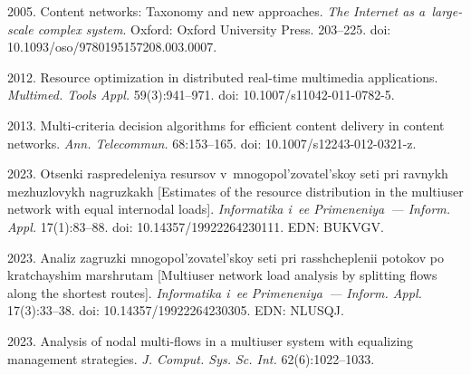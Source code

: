   \begin{multicols}{2}

\renewcommand{\bibname}{\protect\rmfamily References}

{\small\frenchspacing
 {\baselineskip=10.5pt
 \begin{thebibliography}{9} 
 
 
 2005. Content networks: Taxonomy and 
new approaches. \textit{The Internet as a~large-scale complex system}. Oxford: 
Oxford University Press. 203--225. doi: 10.1093/oso/9780195157208.003.0007.


 2012. 
Resource optimization in distributed real-time multimedia applications. 
\textit{Multimed. Tools Appl.} 59(3):941--971. doi: 10.1007/s11042-011-0782-5.

 2013. 
Multi-criteria decision algorithms for efficient content delivery in content 
networks. \textit{Ann. Telecommun.} 68:153--165. doi: 10.1007/s12243-012-0321-z.

 2023. Otsenki 
raspredeleniya resursov v~mnogopol'zovatel'skoy seti pri ravnykh 
mezhuzlovykh nagruzkakh [Estimates of the resource distribution in the multiuser 
network with equal internodal loads]. \textit{Informatika i~ee Primeneniya~--- 
Inform. Appl.} 17(1):83--88. doi: 10.14357/19922264230111. EDN: BUKVGV.

 2023.  Analiz zagruzki  
mnogopol'zovatel'skoy seti pri rasshcheplenii potokov po kratchayshim 
marshrutam [Multiuser network load analysis by splitting flows along the 
shortest routes]. \textit{Informatika i~ee Primeneniya~--- Inform. Appl.} 
17(3):33--38. doi: 10.14357/19922264230305. EDN: NLUSQJ.


 2023. Analysis of nodal 
multi-flows in a multiuser system with equalizing management strategies. 
\textit{J. Comput. Sys. Sc. Int.} 62(6):1022--1033.


\end{thebibliography}}}
\end{multicols}
